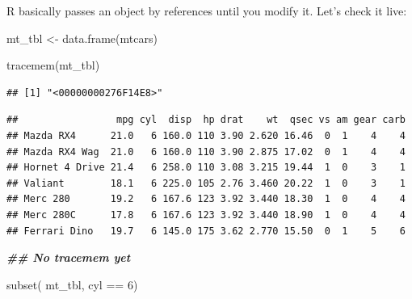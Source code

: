 \documentclass[
]{book}
\newenvironment{Shaded}{\begin{snugshade}}{\end{snugshade}}
\newcommand{\DecValTok}[1]{\textcolor[rgb]{0.00,0.00,0.81}{#1}}
\newcommand{\DocumentationTok}[1]{\textcolor[rgb]{0.56,0.35,0.01}{\textbf{\textit{#1}}}}
\newcommand{\FunctionTok}[1]{\textcolor[rgb]{0.00,0.00,0.00}{#1}}
\newcommand{\NormalTok}[1]{#1}
\newcommand{\OtherTok}[1]{\textcolor[rgb]{0.56,0.35,0.01}{#1}}
\newcommand{\SpecialCharTok}[1]{\textcolor[rgb]{0.00,0.00,0.00}{#1}}
\begin{document}
R basically passes an object by references until you modify it. Let's check it live:

\begin{Shaded}
\begin{Highlighting}[]
\NormalTok{mt\_tbl }\OtherTok{\textless{}{-}} \FunctionTok{data.frame}\NormalTok{(mtcars)}

\FunctionTok{tracemem}\NormalTok{(mt\_tbl)}
\end{Highlighting}
\end{Shaded}

\begin{verbatim}
## [1] "<00000000276F14E8>"
\end{verbatim}

\begin{Shaded}
\end{Shaded}

\begin{verbatim}
##                 mpg cyl  disp  hp drat    wt  qsec vs am gear carb
## Mazda RX4      21.0   6 160.0 110 3.90 2.620 16.46  0  1    4    4
## Mazda RX4 Wag  21.0   6 160.0 110 3.90 2.875 17.02  0  1    4    4
## Hornet 4 Drive 21.4   6 258.0 110 3.08 3.215 19.44  1  0    3    1
## Valiant        18.1   6 225.0 105 2.76 3.460 20.22  1  0    3    1
## Merc 280       19.2   6 167.6 123 3.92 3.440 18.30  1  0    4    4
## Merc 280C      17.8   6 167.6 123 3.92 3.440 18.90  1  0    4    4
## Ferrari Dino   19.7   6 145.0 175 3.62 2.770 15.50  0  1    5    6
\end{verbatim}

\begin{Shaded}
\begin{Highlighting}[]
\DocumentationTok{\#\# No tracemem yet}

\FunctionTok{subset}\NormalTok{(}
\NormalTok{  mt\_tbl,}
\NormalTok{  cyl }\SpecialCharTok{==} \DecValTok{6}\NormalTok{)}
\end{Highlighting}
\end{Shaded}
\end{document}
